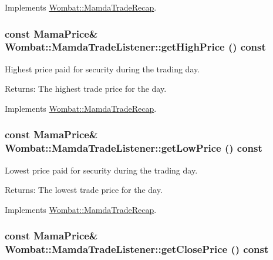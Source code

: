 Implements \hyperlink{classWombat_1_1MamdaTradeRecap_cb3b351b6f32e8e1ec3c7a33864b8726}{Wombat::Mamda\-Trade\-Recap}.\hypertarget{classWombat_1_1MamdaTradeListener_caff6510c7f5bce0b6d4065c5ae8df53}{
\subsubsection[getHighPrice]{\setlength{\rightskip}{0pt plus 5cm}const Mama\-Price\& Wombat::Mamda\-Trade\-Listener::get\-High\-Price () const}}
\label{classWombat_1_1MamdaTradeListener_caff6510c7f5bce0b6d4065c5ae8df53}


Highest price paid for security during the trading day. 

\begin{Desc}
\item[Returns:]The highest trade price for the day. \end{Desc}


Implements \hyperlink{classWombat_1_1MamdaTradeRecap_2ae346c9697a98d723110ae092742a53}{Wombat::Mamda\-Trade\-Recap}.\hypertarget{classWombat_1_1MamdaTradeListener_3358318d745bd8ae681eceba0c7df077}{
\subsubsection[getLowPrice]{\setlength{\rightskip}{0pt plus 5cm}const Mama\-Price\& Wombat::Mamda\-Trade\-Listener::get\-Low\-Price () const}}
\label{classWombat_1_1MamdaTradeListener_3358318d745bd8ae681eceba0c7df077}


Lowest price paid for security during the trading day. 

\begin{Desc}
\item[Returns:]The lowest trade price for the day. \end{Desc}


Implements \hyperlink{classWombat_1_1MamdaTradeRecap_ecd5be58d9917221102b8d35102f2ff7}{Wombat::Mamda\-Trade\-Recap}.\hypertarget{classWombat_1_1MamdaTradeListener_cdd9837ec44cbdfb5bd15b563d99ba7b}{
\subsubsection[getClosePrice]{\setlength{\rightskip}{0pt plus 5cm}const Mama\-Price\& Wombat::Mamda\-Trade\-Listener::get\-Close\-Price () const}}
\label{classWombat_1_1MamdaTradeListener_cdd9837ec44cbdfb5bd15b563d99ba7b}



